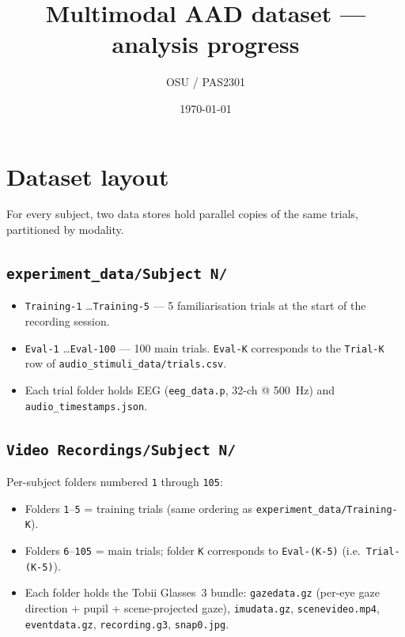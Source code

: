 \documentclass[11pt]{report}
\title{Multimodal AAD dataset --- analysis progress}
\author{OSU / PAS2301}
\date{\today}
\newcommand{\code}[1]{\texttt{\small #1}}
\begin{document}
\maketitle
\tableofcontents
\clearpage

\chapter*{Dataset layout}

For every subject, two data stores hold parallel copies of the same trials,
partitioned by modality.

\section*{\code{experiment\_data/Subject N/}}
\begin{itemize}
  \item \code{Training-1} \ldots \code{Training-5} --- 5 familiarisation trials
        at the start of the recording session.
  \item \code{Eval-1} \ldots \code{Eval-100} --- 100 main trials.
        \code{Eval-K} corresponds to the \code{Trial-K} row of
        \code{audio\_stimuli\_data/trials.csv}.
  \item Each trial folder holds EEG (\code{eeg\_data.p}, 32-ch @ \SI{500}{\Hz})
        and \code{audio\_timestamps.json}.
\end{itemize}

\section*{\code{Video Recordings/Subject N/}}
Per-subject folders numbered \code{1} through \code{105}:
\begin{itemize}
  \item Folders \code{1}--\code{5} = training trials (same ordering as
        \code{experiment\_data/Training-K}).
  \item Folders \code{6}--\code{105} = main trials; folder \code{K}
        corresponds to \code{Eval-(K-5)} (i.e.\ \code{Trial-(K-5)}).
  \item Each folder holds the Tobii Glasses~3 bundle:
        \code{gazedata.gz} (per-eye gaze direction + pupil + scene-projected
        gaze), \code{imudata.gz}, \code{scenevideo.mp4},
        \code{eventdata.gz}, \code{recording.g3}, \code{snap0.jpg}.
\end{itemize}
\end{document}
